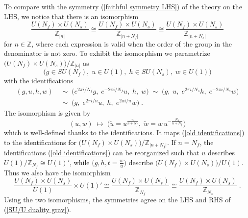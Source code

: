 \documentclass[a4paper, 12pt]{article}
\numberwithin{equation}{section}
\newcommand{\be}{\begin{equation}} \newcommand{\ee}{\end{equation}}
\newcommand{\bea}{\begin{equation} \begin{aligned}} \newcommand{\eea}{\end{aligned} \end{equation}}
\newcommand{\bZ}{\mathbb{Z}}
\begin{document}
To compare with the symmetry (\ref{faithful symmetry LHS}) of the theory on the LHS, we notice that there is an isomorphism
\be
\label{symmetry isomorphism I}
\frac{U(N_f) \times U(N_s)}{\bZ_{|n|}} \cong \frac{U(N_f) \times U(N_s)}{\bZ_{|n+N_f|}} \cong \frac{U(N_f) \times U(N_s)}{\bZ_{|n+N_s|}}
\ee
for $n\in\bZ$, where each expression is valid when the order of the group in the denominator is not zero. To exhibit the isomorphism we parametrize $\big( U(N_f) \times U(N_s) \big)/\bZ_{|n|}$ as
\be
\Big( g \in SU(N_f) ,\; u \in U(1),\; h \in SU(N_s),\; w \in U(1) \Big)
\ee
with the identifications
\bea
\label{old identifications}
(g,u,h,w) & \;\sim\; \Big( e^{2\pi i/N_f} g,\; e^{-2\pi i /N_f} u,\; h,\; w \Big) \;\sim\; \Big( g,\; u,\; e^{2\pi i/N_s} h,\; e^{-2\pi i /N_s} w \Big) \\
& \;\sim\; \Big( g,\; e^{2\pi i/n} u,\; h,\; e^{2\pi i /n} w \Big) \;.
\eea
The isomorphism is given by
\be
(u,w) \;\mapsto\; \Big( \tilde u = u^{\frac{n}{n+N_f}},\; \tilde w = w \, u^{-\frac{N_f}{n+N_f}} \Big)
\ee
which is well-defined thanks to the identifications. It maps (\ref{old identifications}) to the identifications for $\big( U(N_f) \times U(N_s) \big)/\bZ_{|n+N_f|}$. If $n=N_f$, the identifications (\ref{old identifications}) can be reorganized such that $u$ describes $U(1)/\bZ_{N_f} \cong U(1)'$, while $\big( g,h,t = \frac wu \big)$ describe $\big( U(N_f) \times U(N_s) \big)/U(1)$. Thus we also have the isomorphism
\be
\label{symmetry isomorphism II}
\frac{U(N_f) \times U(N_s)}{U(1)} \times U(1)' \cong \frac{U(N_f) \times U(N_s)}{\bZ_{N_f}} \cong \frac{U(N_f) \times U(N_s)}{\bZ_{N_s}} \;.
\ee
Using the two isomorphisms, the symmetries agree on the LHS and RHS of (\ref{SU/U duality grav}).
\end{document}
